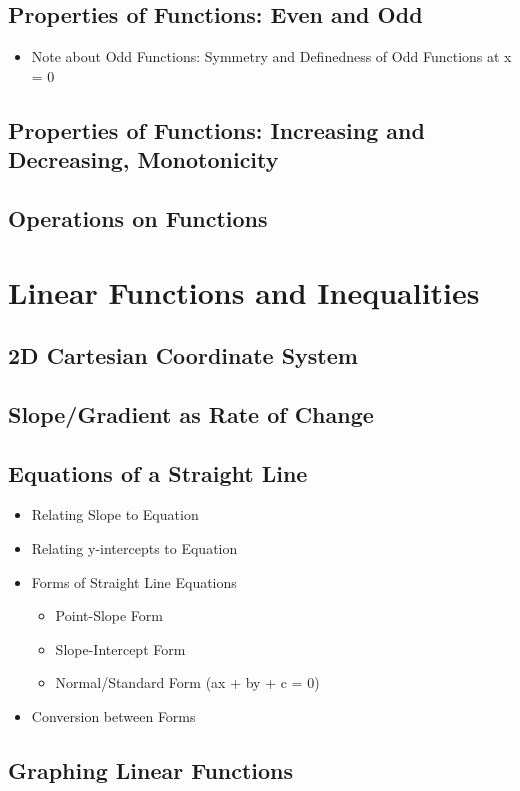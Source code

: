 \documentclass[11pt]{article}
\begin{document}
\subsection{Properties of Functions: Even and Odd}
\begin{itemize}
    \item Note about Odd Functions: Symmetry and Definedness of Odd Functions at x = 0
\end{itemize}
\subsection{Properties of Functions: Increasing and Decreasing, Monotonicity}
\subsection{Operations on Functions}

\setcounter{section}{5}
\section{Linear Functions and Inequalities}
\subsection{2D Cartesian Coordinate System}
\subsection{Slope/Gradient as Rate of Change}
\subsection{Equations of a Straight Line}
\begin{itemize}
    \item Relating Slope to Equation
    \item Relating y-intercepts to Equation
    \item Forms of Straight Line Equations
    \begin{itemize}
        \item Point-Slope Form
        \item Slope-Intercept Form
        \item Normal/Standard Form (ax + by + c = 0)
    \end{itemize}
    \item Conversion between Forms
\end{itemize}
\subsection{Graphing Linear Functions}
\end{document}
